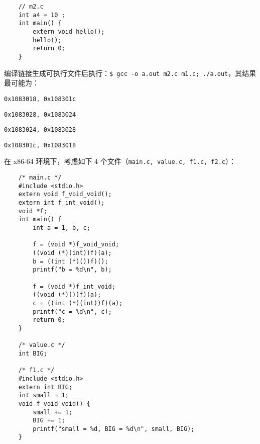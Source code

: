 \begin{problems}
\begin{verbatim}
    // m2.c
    int a4 = 10 ;
    int main() {
        extern void hello();
        hello();
        return 0; 
    }
        \end{verbatim}
        编译链接生成可执行文件后执行：\verb|$ gcc -o a.out m2.c m1.c; ./a.out|，其结果最可能为：
        \begin{choices}
            \item \verb|0x1083018, 0x108301c|
            \item \verb|0x1083028, 0x1083024|
            \item \verb|0x1083024, 0x1083028|
            \item \verb|0x108301c, 0x1083018|
        \end{choices}
         在 x86-64 环境下，考虑如下 4 个文件（\verb|main.c, value.c, f1.c, f2.c|）：
        \begin{verbatim}
    /* main.c */
    #include <stdio.h>
    extern void f_void_void();
    extern int f_int_void();
    void *f;
    int main() {
        int a = 1, b, c;

        f = (void *)f_void_void;
        ((void (*)(int))f)(a);
        b = ((int (*)())f)();
        printf("b = %d\n", b);

        f = (void *)f_int_void;
        ((void (*)())f)(a);
        c = ((int (*)(int))f)(a);
        printf("c = %d\n", c);
        return 0;
    }

    /* value.c */
    int BIG;

    /* f1.c */
    #include <stdio.h>
    extern int BIG;
    int small = 1;
    void f_void_void() {
        small += 1;
        BIG += 1;
        printf("small = %d, BIG = %d\n", small, BIG);
    }


\end{verbatim}
\end{problems}
